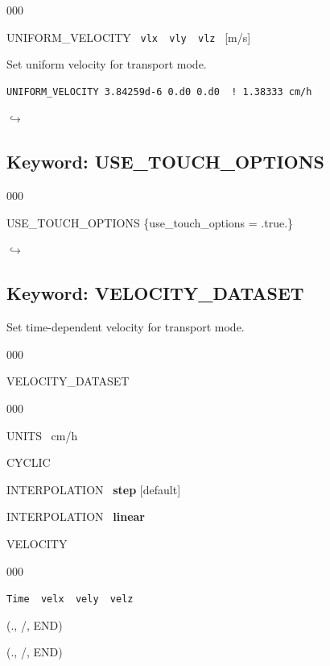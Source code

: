 \documentclass[12pt]{article}
\newcommand\return{{\hfill$\hookrightarrow$}}
\begin{document}

\begin{deflist}{000}
\item[UNIFORM\_VELOCITY] \ {\tt vlx \ vly \ vlz} \ [m/s]
\end{deflist}

 Set uniform velocity for transport mode.

\begin{verbatim}
UNIFORM_VELOCITY 3.84259d-6 0.d0 0.d0  ! 1.38333 cm/h
\end{verbatim}

\hyperlink{target_key}{\return}


\newpage
\protect\hypertarget{target_touch}{}

\subsection{Keyword: USE\_TOUCH\_OPTIONS}


\begin{deflist}{000}
\item[USE\_TOUCH\_OPTIONS] \{use\_touch\_options = .true.\}
\end{deflist}



\hyperlink{target_key}{\return}


\newpage
\protect\hypertarget{target_veldata}{}

\subsection{Keyword: VELOCITY\_DATASET}

 Set time-dependent velocity for transport mode.

\begin{deflist}{000}
\item[VELOCITY\_DATASET] ~
\begin{deflist}{000}
\item[UNITS] \ cm/h
\item[CYCLIC]
\item[INTERPOLATION] \ {\bf step} [default]
\item[INTERPOLATION] \ {\bf linear}
\item[VELOCITY] ~
\begin{deflist}{000}
\item[{\tt Time \ velx \ vely \ velz}]
\end{deflist}
\item[(., /, END)]
\end{deflist}
\item[(., /, END)]
\end{deflist}
\end{document}
